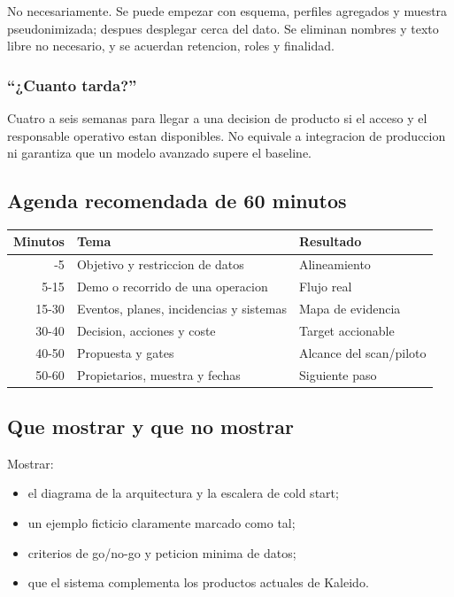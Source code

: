 \documentclass[
  spanish,
  10pt,
  a4paper,
]{article}
\newcounter{none} %
\providecommand{\tightlist}{%
  \setlength{\itemsep}{0pt}\setlength{\parskip}{0pt}}
\begin{document}
No necesariamente. Se puede empezar con esquema, perfiles agregados y
muestra pseudonimizada; despues desplegar cerca del dato. Se eliminan
nombres y texto libre no necesario, y se acuerdan retencion, roles y
finalidad.

\subsubsection{``¿Cuanto tarda?''}\label{cuanto-tarda}

Cuatro a seis semanas para llegar a una decision de producto si el
acceso y el responsable operativo estan disponibles. No equivale a
integracion de produccion ni garantiza que un modelo avanzado supere el
baseline.

\subsection{Agenda recomendada de 60
minutos}\label{agenda-recomendada-de-60-minutos}

{\def\LTcaptype{none} %
\begin{longtable}[]{@{}rll@{}}
\toprule\noalign{}
Minutos & Tema & Resultado \\
\midrule\noalign{}
\endhead
\bottomrule\noalign{}
\endlastfoot
0-5 & Objetivo y restriccion de datos & Alineamiento \\
5-15 & Demo o recorrido de una operacion & Flujo real \\
15-30 & Eventos, planes, incidencias y sistemas & Mapa de evidencia \\
30-40 & Decision, acciones y coste & Target accionable \\
40-50 & Propuesta y gates & Alcance del scan/piloto \\
50-60 & Propietarios, muestra y fechas & Siguiente paso \\
\end{longtable}
}

\subsection{Que mostrar y que no
mostrar}\label{que-mostrar-y-que-no-mostrar}

Mostrar:

\begin{itemize}
\tightlist
\item
  el diagrama de la arquitectura y la escalera de cold start;
\item
  un ejemplo ficticio claramente marcado como tal;
\item
  criterios de go/no-go y peticion minima de datos;
\item
  que el sistema complementa los productos actuales de Kaleido.
\end{itemize}
\end{document}
